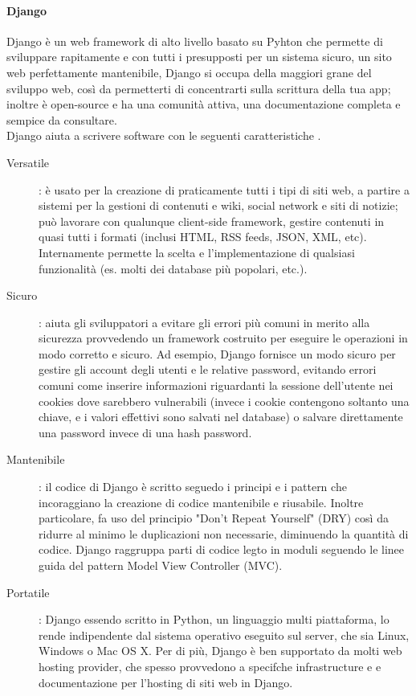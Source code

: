 \paragraph{Django}
Django è un web framework di alto livello basato su Pyhton che permette di sviluppare rapitamente e con tutti i presupposti per un sistema sicuro, un sito web
perfettamente mantenibile, Django si occupa della maggiori grane del sviluppo web, così da permetterti di concentrarti sulla scrittura della tua app; inoltre 
è open-source e ha una comunità attiva, una documentazione completa e sempice da consultare.
\ \\
Django aiuta a scrivere software con le seguenti caratteristiche \cite{django-documentation}.
\begin{description}
	\item[Versatile]: è usato per la creazione di praticamente tutti i tipi di siti web, a partire a sistemi per la gestioni di contenuti e wiki,
	social network e siti di notizie; può lavorare con qualunque client-side framework, gestire contenuti in quasi tutti i formati (inclusi HTML, 
	RSS feeds, JSON, XML, etc). Internamente permette la scelta e l'implementazione di qualsiasi funzionalità (es. molti dei database più popolari, etc.).
	\item[Sicuro]: aiuta gli sviluppatori a evitare gli errori più comuni in merito alla sicurezza provvedendo un framework costruito per eseguire 
	le operazioni in modo corretto e sicuro. Ad esempio, Django fornisce un modo sicuro per gestire gli account degli utenti e le relative
	password, evitando errori comuni come inserire informazioni riguardanti la sessione dell'utente nei cookies dove sarebbero vulnerabili (invece i cookie
	contengono soltanto una chiave, e i valori effettivi sono salvati nel database) o salvare direttamente una password invece di una hash password.
	\item[Mantenibile]: il codice di Django è scritto seguedo i principi e i pattern che incoraggiano la creazione di codice mantenibile e riusabile. Inoltre
	particolare, fa uso del principio "Don't Repeat Yourself" (DRY) così da ridurre al minimo le duplicazioni non necessarie, diminuendo la quantità di codice.
	Django raggruppa parti di codice legto in moduli seguendo le linee guida del pattern Model View Controller (MVC).
	\item[Portatile]: Django essendo scritto in Python, un linguaggio multi piattaforma, lo rende indipendente dal sistema operativo eseguito sul server, che
	sia Linux, Windows o Mac OS X. Per di più, Django è ben supportato da molti web hosting provider, che spesso provvedono a specifche infrastructure e 
	e documentazione per l'hosting di siti web in Django.
\end{description}

